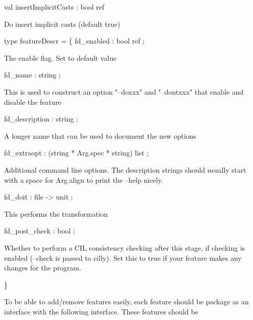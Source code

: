 \documentclass[11pt]{article}
\begin{document}
\label{val:Cil.insertImplicitCasts}\begin{ocamldoccode}
val insertImplicitCasts : bool ref
\end{ocamldoccode}
\begin{ocamldocdescription}
Do insert implicit casts (default true)


\end{ocamldocdescription}




\label{type:Cil.featureDescr}\begin{ocamldoccode}
type featureDescr = \{
  fd_enabled : bool ref ;
\end{ocamldoccode}
\begin{ocamldoccomment}
The enable flag. Set to default value
\end{ocamldoccomment}
\begin{ocamldoccode}
  fd_name : string ;
\end{ocamldoccode}
\begin{ocamldoccomment}
This is used to construct an option "--doxxx" and "--dontxxx" that 
 enable and disable the feature
\end{ocamldoccomment}
\begin{ocamldoccode}
  fd_description : string ;
\end{ocamldoccode}
\begin{ocamldoccomment}
A longer name that can be used to document the new options
\end{ocamldoccomment}
\begin{ocamldoccode}
  fd_extraopt : (string * Arg.spec * string) list ;
\end{ocamldoccode}
\begin{ocamldoccomment}
Additional command line options.  The description strings should
        usually start with a space for Arg.align to print the --help nicely.
\end{ocamldoccomment}
\begin{ocamldoccode}
  fd_doit : file -> unit ;
\end{ocamldoccode}
\begin{ocamldoccomment}
This performs the transformation
\end{ocamldoccomment}
\begin{ocamldoccode}
  fd_post_check : bool ;
\end{ocamldoccode}
\begin{ocamldoccomment}
Whether to perform a CIL consistency checking after this stage, if 
 checking is enabled (--check is passed to cilly). Set this to true if 
 your feature makes any changes for the program.
\end{ocamldoccomment}
\begin{ocamldoccode}
\}
\end{ocamldoccode}
\begin{ocamldocdescription}
To be able to add/remove features easily, each feature should be package 
 as an interface with the following interface. These features should be


\end{ocamldocdescription}
\end{document}
